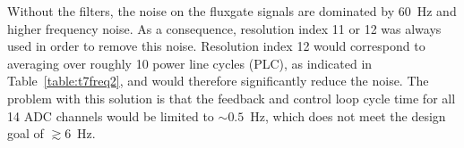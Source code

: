 
Without the filters, the noise on the fluxgate signals are dominated
by 60~Hz and higher frequency noise.  As a consequence, resolution
index 11 or 12 was always used in order to remove this noise.
Resolution index 12 would correspond to averaging over roughly 10
power line cycles (PLC), as indicated in Table~\ref{table:t7freq2},
and would therefore significantly reduce the noise.  The problem with
this solution is that the feedback and control loop cycle time for all
14 ADC channels would be limited to $\sim 0.5$~Hz, which does not meet
the design goal of $\gtrsim 6$~Hz.

